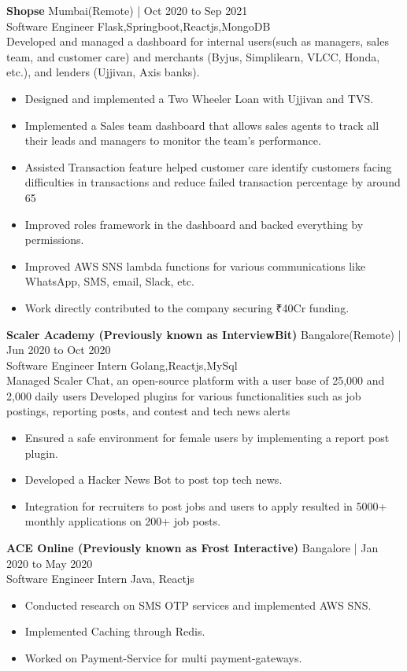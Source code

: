 \documentclass[11pt]{article}
\newcommand{\job}[4]{
    \begingroup
        \textbf{\small#1}
        \hfill\color{black!70}\small{#3}
        \\
        \small#2
        \hfill\color{black!70}\small{#4}
    \endgroup
}
\begin{document}
\begin{paracol}{2}
{      
      \job{Shopse}{Software Engineer}{Mumbai(Remote) | Oct 2020 to Sep 2021}{Flask,Springboot,Reactjs,MongoDB}{}\\
      \textrm{Developed and managed a dashboard for internal users(such as managers, sales team, and customer care) and merchants (Byjus, Simplilearn, VLCC, Honda, etc.), and lenders (Ujjivan, Axis banks).}
      \begin{itemize}
        \item Designed and implemented a Two Wheeler Loan with Ujjivan and TVS.
        \item Implemented a Sales team dashboard that allows sales agents to track all their leads and managers to monitor the team's
performance.
        \item Assisted Transaction feature helped customer care identify customers facing difficulties in transactions and reduce failed transaction percentage by around 65%
        \item Improved roles framework in the dashboard and backed everything by permissions.
        \item Improved AWS SNS lambda functions for various communications like WhatsApp, SMS, email, Slack, etc.
        \item Work directly contributed to the company securing ₹40Cr funding.
      \end{itemize}
      \vspace{4mm}
      
      \job{Scaler Academy (Previously known as InterviewBit)}{Software Engineer Intern}{Bangalore(Remote) | Jun 2020 to Oct 2020}{Golang,Reactjs,MySql}{}\\
      \textrm{Managed Scaler Chat, an open-source platform with a user base of 25,000 and 2,000 daily users
Developed plugins for various functionalities such as job postings, reporting posts, and contest and tech news alerts}
      \begin{itemize}
        \item Ensured a safe environment for female users by implementing a report post plugin.
        \item Developed a Hacker News Bot to post top tech news.
        \item Integration for recruiters to post jobs and users to apply resulted in 5000+ monthly applications on 200+ job posts.
      \end{itemize}
      \vspace{4mm}

      \job{ACE Online (Previously known as Frost Interactive)}{Software Engineer Intern}{Bangalore | Jan 2020 to May 2020}{Java, Reactjs}{}\\
      \begin{itemize}
        \item Conducted research on SMS OTP services and implemented AWS SNS.
        \item Implemented Caching through Redis.
        \item Worked on Payment-Service for multi payment-gateways.
      \end{itemize}
      \vspace{4mm}

}
\end{paracol}
\end{document}
